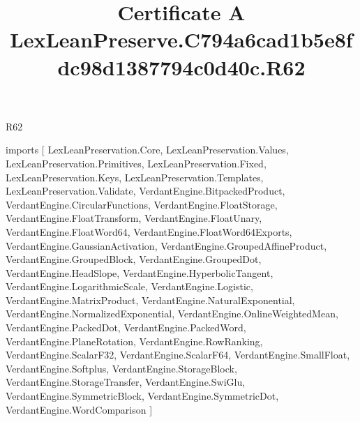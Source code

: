 \begin{lexlean}{R62}
\title{Certificate A LexLeanPreserve.C794a6cad1b5e8fdc98d1387794c0d40c.R62}
\begin{coremodule}
imports [
  LexLeanPreservation.Core,
  LexLeanPreservation.Values,
  LexLeanPreservation.Primitives,
  LexLeanPreservation.Fixed,
  LexLeanPreservation.Keys,
  LexLeanPreservation.Templates,
  LexLeanPreservation.Validate,
  VerdantEngine.BitpackedProduct,
  VerdantEngine.CircularFunctions,
  VerdantEngine.FloatStorage,
  VerdantEngine.FloatTransform,
  VerdantEngine.FloatUnary,
  VerdantEngine.FloatWord64,
  VerdantEngine.FloatWord64Exports,
  VerdantEngine.GaussianActivation,
  VerdantEngine.GroupedAffineProduct,
  VerdantEngine.GroupedBlock,
  VerdantEngine.GroupedDot,
  VerdantEngine.HeadSlope,
  VerdantEngine.HyperbolicTangent,
  VerdantEngine.LogarithmicScale,
  VerdantEngine.Logistic,
  VerdantEngine.MatrixProduct,
  VerdantEngine.NaturalExponential,
  VerdantEngine.NormalizedExponential,
  VerdantEngine.OnlineWeightedMean,
  VerdantEngine.PackedDot,
  VerdantEngine.PackedWord,
  VerdantEngine.PlaneRotation,
  VerdantEngine.RowRanking,
  VerdantEngine.ScalarF32,
  VerdantEngine.ScalarF64,
  VerdantEngine.SmallFloat,
  VerdantEngine.Softplus,
  VerdantEngine.StorageBlock,
  VerdantEngine.StorageTransfer,
  VerdantEngine.SwiGlu,
  VerdantEngine.SymmetricBlock,
  VerdantEngine.SymmetricDot,
  VerdantEngine.WordComparison
]


\end{coremodule}
\end{lexlean}
